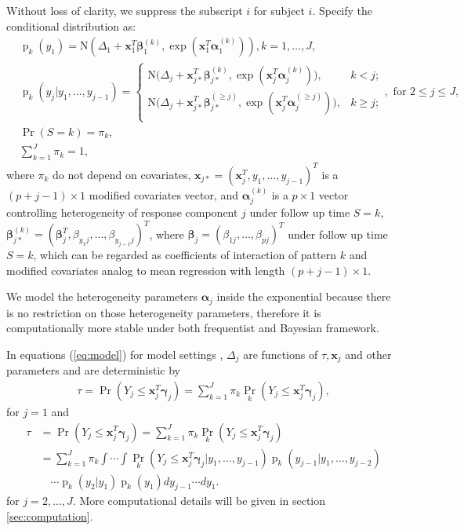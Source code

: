 \documentclass[12pt]{article}
\DeclareMathOperator{\pr}{p}
\DeclareMathOperator{\prob}{Pr}
\begin{document}
Without loss of clarity, we suppress the subscript $i$ for subject
$i$. Specify the conditional distribution as:
\begin{align}
  & \pr_k(y_1) = \textrm{N} (\Delta_1 + \bm x_1^T \bm \beta_1^{(k)}, 
\exp (\bm x_{1}^T \bm \alpha_1^{(k)} ) ), k = 1, \ldots, J, \label{eq:model}\\
  &\pr_k(y_j|y_1, \ldots, y_{j-1}) =
  \begin{cases}
    \textrm{N} \big (\Delta_j + \bm x_{j*}^T \bm \beta_{j*}^{(k)}, 
\exp (\bm x_{j}^T \bm \alpha_j^{(k)} ) \big), & k < j ;  \nonumber \\
    \textrm{N} \big (\Delta_j + \bm x_{j*}^T \bm \beta_{j*}^{(\geq j)}, 
\exp (\bm x_{j}^T \bm \alpha_j^{(\geq j)} ) \big), & k \geq j ; \nonumber \\
  \end{cases}, \text{ for } 2 \leq j \leq J, \nonumber \\
  & \prob (S = k)  = \pi_k, \nonumber \\
  & \sum_{k=1}^J \pi_k = 1, \nonumber
\end{align}
where $\pi_k$ do not depend on covariates, $\bm x_{j*} = (\bm x_j^T, y_1,
\ldots, y_{j-1})^T$ is a $(p + j - 1) \times 1$ modified covariates
vector, and $\bm \alpha_j^{(k)}$ is a $p \times 1$ vector controlling
heterogeneity of response component $j$ under follow up time $S = k$,
$\bm \beta_{j*}^{(k)} = (\bm \beta_j^T, \beta_{y_1j}, \ldots,
\beta_{y_{j-1}j})^T$, where $\bm \beta_j = (\beta_{1j},
\ldots, \beta_{pj})^{T}$ under follow up time $S=k$, which can be regarded as coefficients of
interaction of pattern $k$ and modified covariates analog to mean
regression with length $ (p + j - 1) \times 1$. 

We model the heterogeneity parameters $\bm \alpha_j$ inside the exponential
because there is no restriction on those heterogeneity parameters,
therefore it is computationally more stable under both frequentist and
Bayesian framework.

In equations (\ref{eq:model}) for model settings , $\Delta_j$ are functions of 
$\tau, \bm x_j$ and other parameters and are
deterministic by
\begin{align}
  \label{eq:deltaeqn1}
  \tau = \prob (Y_j \leq \bm x_j^T \bm \gamma_j ) = \sum_{k=1}^J 
\pi_k\prob_k (Y_j \leq
  \bm x_j^T \bm \gamma_j ),
\end{align}
for $j = 1$ and
\begin{align}\label{eq:deltaeqn2}
  \tau &= \prob (Y_j \leq \bm x_j^{T} \bm \gamma_j ) = \sum_{k=1}^J 
\pi_k\prob_k (Y_j \leq \bm x_j^{T} \bm \gamma_j ) \\
  & = \sum_{k=1}^J \pi_k \int\cdots \int \prob_k (Y_j \leq \bm x_j^{T} 
\bm \gamma_j |y_1,\ldots,
  y_{j-1}) \pr_k (y_{j-1}| y_1, \ldots, y_{j-2})  \nonumber \\
& \quad \cdots \pr_k (y_{2}| y_1) \pr_k(y_1) dy_{j-1}\cdots dy_1. \nonumber
\end{align}
for $j = 2, \ldots, J$. More computational details will be given in
section \ref{sec:computation}.
\end{document}
